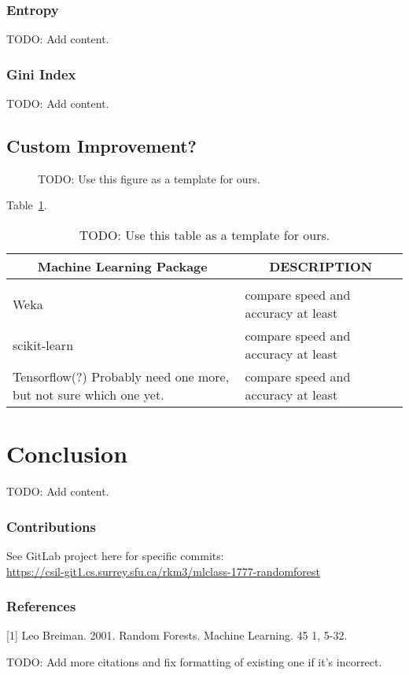 \documentclass{article} %
\begin{document}
\subsubsection{Entropy}
TODO: Add content.

\subsubsection{Gini Index}
TODO: Add content.

\subsection{Custom Improvement?}



\begin{figure}[h]
\begin{center}
\fbox{\rule[-.5cm]{0cm}{4cm} \rule[-.5cm]{4cm}{0cm}}
\end{center}
\caption{TODO: Use this figure as a template for ours.}
\end{figure}

Table~\ref{sample-table}.

\begin{table}[t]
\caption{TODO: Use this table as a template for ours.}
\label{sample-table}
\begin{center}
\begin{tabular}{ll}
\multicolumn{1}{c}{\bf Machine Learning Package} &\multicolumn{1}{c}{\bf DESCRIPTION}
\\ \hline \\
Weka         &compare speed and accuracy at least \\
scikit-learn             &compare speed and accuracy at least \\
Tensorflow(?) Probably need one more, but not sure which one yet.             &compare speed and accuracy at least \\
\end{tabular}
\end{center}
\end{table}

\section{Conclusion}
TODO: Add content.

\subsubsection*{Contributions}
See GitLab project here for specific commits:\\
\href{
    https://csil-git1.cs.surrey.sfu.ca/rkm3/mlclass-1777-randomforest
}{
    https://csil-git1.cs.surrey.sfu.ca/rkm3/mlclass-1777-randomforest
}

\subsubsection*{References}


\small{
[1] Leo Breiman. 2001. Random Forests. Machine Learning. 45 1, 5-32.

TODO: Add more citations and fix formatting of existing one if it's incorrect.
}
\end{document}
